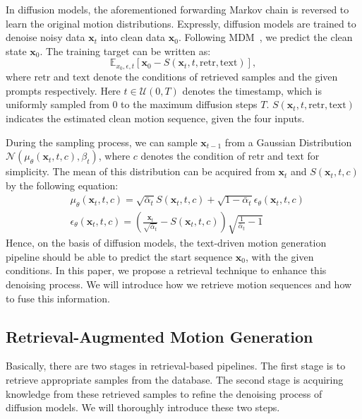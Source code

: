 \documentclass[10pt,twocolumn,letterpaper]{article}
\begin{document}
In diffusion models, the aforementioned forwarding Markov chain is reversed to learn the original motion distributions. Expressly, diffusion models are trained to denoise noisy data $\mathbf{x}_t$ into clean data $\mathbf{x}_0$. Following MDM~\cite{tevet2022human}, we predict the clean state $\mathbf{x}_0$. The training target can be written as:
\begin{equation}
\label{eq:objective}
    \mathbb{E}_{x_0,\epsilon,t}[\mathbf{x}_0 - S(\mathbf{x}_t,t,\mathrm{retr},\mathrm{text})],
\end{equation}
where $\mathrm{retr}$ and $\mathrm{text}$ denote the conditions of retrieved samples and the given prompts respectively. Here $t \in \mathcal{U}(0, T)$ denotes the timestamp, which is uniformly sampled from $0$ to the maximum diffusion steps $T$. $S(\mathbf{x}_t,t,\mathrm{retr},\mathrm{text})$ indicates the estimated clean motion sequence, given the four inputs.

During the sampling process, we can sample $\mathbf{x}_{t-1}$ from a Gaussian Distribution $\mathcal{N}(\mu_{\theta}(\mathbf{x}_t,t,c), \beta_t)$, where $c$ denotes the condition of $\mathrm{retr}$ and $\mathrm{text}$ for simplicity. The mean of this distribution can be acquired from $\mathbf{x}_t$ and $S(\mathbf{x}_t,t,c)$ by the following equation:
\begin{equation}
    \begin{aligned}
    & \mu_{\theta}(\mathbf{x}_t,t,c) = \sqrt{\bar{\alpha}_t} S(\mathbf{x}_t,t,c) + \sqrt{1 - \bar{\alpha}_t}\epsilon_{\theta}(\mathbf{x}_t,t,c) \\
    & \epsilon_{\theta}(\mathbf{x}_t,t,c)=(\frac{\mathbf{x}_t}{\sqrt{\bar{\alpha}_t}} - S(\mathbf{x}_t,t,c)) \sqrt{\frac{1}{\bar{\alpha}_t}-1}
    \end{aligned}
\end{equation}
Hence, on the basis of diffusion models, the text-driven motion generation pipeline should be able to predict the start sequence $\mathbf{x}_0$, with the given conditions. In this paper, we propose a retrieval technique to enhance this denoising process. We will introduce how we retrieve motion sequences and how to fuse this information.


\subsection{Retrieval-Augmented Motion Generation}
\label{sec:retreival}


Basically, there are two stages in retrieval-based pipelines. The first stage is to retrieve appropriate samples from the database. The second stage is acquiring knowledge from these retrieved samples to refine the denoising process of diffusion models. We will thoroughly introduce these two steps.
\end{document}
